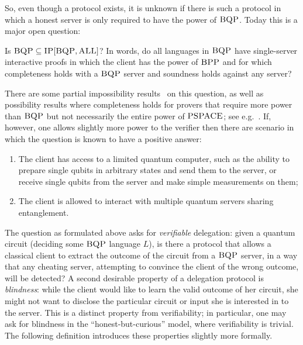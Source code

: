  So, even though a protocol exists, it is unknown if there is such a protocol in which a honest server is only required to have the power of $\textsc{BQP}$. Today this is a major open question: 

\begin{oq}
Is $\textsc{BQP} \subseteq \textsc{IP}[\textsc{BQP},\textsc{ALL}]$? In words, do all languages in $\textsc{BQP}$ have single-server interactive proofs in which the client has the power of $\textsc{BPP}$ and for which completeness holds with a $\textsc{BQP}$ server and soundness holds against any server? 
\end{oq}

There are some  partial impossibility results~\cite{aaronson2017implausibility} on this question, as well as possibility results where completeness holds for provers that require more power than $\textsc{BQP}$ but not necessarily the entire power of $\textsc{PSPACE}$; see e.g.~\cite{aharonov2017quantum}. If, however, one allows slightly more power to the verifier then there are scenario in which the question is known to have a positive answer: 
\begin{enumerate}
\item The client has access to a limited quantum computer, such as the ability to prepare single qubits in arbitrary states and send them to the server, or receive single qubits from the server and make simple measurements on them;
\item The client is allowed to interact with multiple quantum servers sharing entanglement.
\end{enumerate}

The question as formulated above asks for \emph{verifiable} delegation: given a quantum circuit (deciding some $\textsc{BQP}$ language $L$), is there a protocol that allows a classical client to extract the outcome of the circuit from a $\textsc{BQP}$ server, in a way that any cheating server, attempting to convince the client of the wrong outcome, will be detected?  A second desirable property of a delegation protocol is \emph{blindness}: while the client would like to learn the valid outcome of her circuit, she might not want to disclose the particular circuit or input she is interested in to the server. This is a distinct property from verifiability; in particular, one may ask for blindness in the ``honest-but-curious'' model, where verifiability is trivial. The following definition introduces these properties slightly more formally. 


